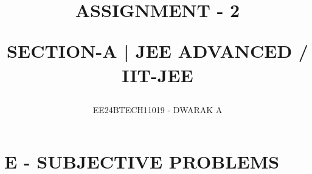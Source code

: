 \documentclass[journal,12pt,twocolumn]{IEEEtran}
\theoremstyle{remark}
\begin{document}

\vspace{3cm}

\title{ASSIGNMENT - 2

SECTION-A | JEE ADVANCED / IIT-JEE}
\author{EE24BTECH11019 - DWARAK A}

\maketitle
\newpage
\bigskip

\renewcommand{\thefigure}{\theenumi}
\renewcommand{\thetable}{\theenumi}

\section*{E - SUBJECTIVE PROBLEMS}
\bigskip
\end{document}
